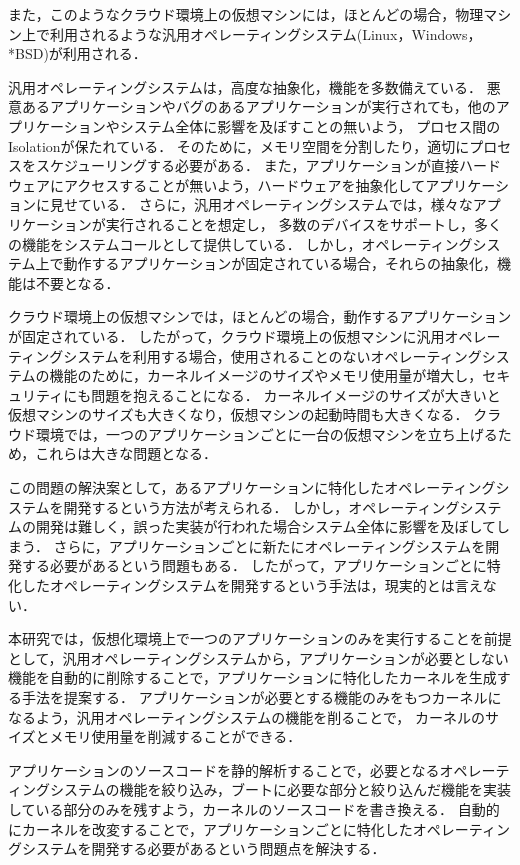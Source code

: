 \documentclass[graduation-thesis]{mlarticle}
\begin{document}
また，このようなクラウド環境上の仮想マシンには，ほとんどの場合，物理マシン上で利用されるような汎用オペレーティングシステム(Linux，Windows，*BSD)が利用される．

汎用オペレーティングシステムは，高度な抽象化，機能を多数備えている．
悪意あるアプリケーションやバグのあるアプリケーションが実行されても，他のアプリケーションやシステム全体に影響を及ぼすことの無いよう，
プロセス間のIsolationが保たれている．
そのために，メモリ空間を分割したり，適切にプロセスをスケジューリングする必要がある．
また，アプリケーションが直接ハードウェアにアクセスすることが無いよう，ハードウェアを抽象化してアプリケーションに見せている．
さらに，汎用オペレーティングシステムでは，様々なアプリケーションが実行されることを想定し，
多数のデバイスをサポートし，多くの機能をシステムコールとして提供している．
しかし，オペレーティングシステム上で動作するアプリケーションが固定されている場合，それらの抽象化，機能は不要となる．

クラウド環境上の仮想マシンでは，ほとんどの場合，動作するアプリケーションが固定されている．
したがって，クラウド環境上の仮想マシンに汎用オペレーティングシステムを利用する場合，使用されることのないオペレーティングシステムの機能のために，カーネルイメージのサイズやメモリ使用量が増大し，セキュリティにも問題を抱えることになる． 
カーネルイメージのサイズが大きいと仮想マシンのサイズも大きくなり，仮想マシンの起動時間も大きくなる．
クラウド環境では，一つのアプリケーションごとに一台の仮想マシンを立ち上げるため，これらは大きな問題となる．

この問題の解決案として，あるアプリケーションに特化したオペレーティングシステムを開発するという方法が考えられる．
しかし，オペレーティングシステムの開発は難しく，誤った実装が行われた場合システム全体に影響を及ぼしてしまう．
さらに，アプリケーションごとに新たにオペレーティングシステムを開発する必要があるという問題もある．
したがって，アプリケーションごとに特化したオペレーティングシステムを開発するという手法は，現実的とは言えない．


本研究では，仮想化環境上で一つのアプリケーションのみを実行することを前提として，汎用オペレーティングシステムから，アプリケーションが必要としない機能を自動的に削除することで，アプリケーションに特化したカーネルを生成する手法を提案する．
アプリケーションが必要とする機能のみをもつカーネルになるよう，汎用オペレーティングシステムの機能を削ることで，
カーネルのサイズとメモリ使用量を削減することができる．

アプリケーションのソースコードを静的解析することで，必要となるオペレーティングシステムの機能を絞り込み，ブートに必要な部分と絞り込んだ機能を実装している部分のみを残すよう，カーネルのソースコードを書き換える．
自動的にカーネルを改変することで，アプリケーションごとに特化したオペレーティングシステムを開発する必要があるという問題点を解決する．
\end{document}
